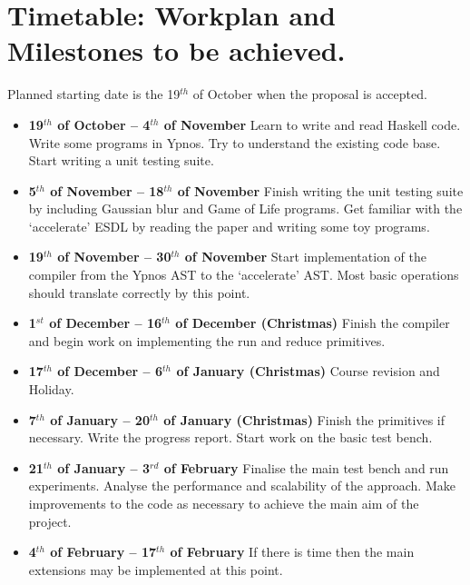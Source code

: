 \section*{Timetable: Workplan and Milestones to be achieved.}

Planned starting date is the 19$^{th}$ of October when the proposal is 
accepted.

\begin{itemize}

\item \textbf{19$^{th}$ of October -- 4$^{th}$ of November} Learn to write and read 
Haskell code.  Write some programs in Ypnos. Try to understand the existing 
code base.  Start writing a unit testing suite.

\item \textbf{5$^{th}$ of November -- 18$^{th}$ of November} Finish writing the unit 
testing suite by including Gaussian blur and Game of Life programs. Get 
familiar with the `accelerate' ESDL by reading the paper and writing some toy 
programs. 

\item \textbf{19$^{th}$ of November -- 30$^{th}$ of November} Start 
implementation of the compiler from the Ypnos AST to the `accelerate' AST.  
Most basic operations should translate correctly by this point.

\item \textbf{1$^{st}$ of December -- 16$^{th}$ of December (Christmas)} Finish 
the compiler and begin work on implementing the run and reduce primitives.

\item \textbf{17$^{th}$ of December -- 6$^{th}$ of January (Christmas)} Course 
revision and Holiday.

\item \textbf{7$^{th}$ of January -- 20$^{th}$ of January (Christmas)} Finish the 
primitives if necessary.  Write the progress report.  Start work on the basic 
test bench.

\item \textbf{21$^{th}$ of January -- 3$^{rd}$ of February} Finalise the main 
test bench and run experiments.  Analyse the performance and scalability of the 
approach.  Make improvements to the code as necessary to achieve the main aim 
of the project. 

\item \textbf{4$^{th}$ of February -- 17$^{th}$ of February} If there is time then 
the main extensions may be implemented at this point.


\end{itemize}
